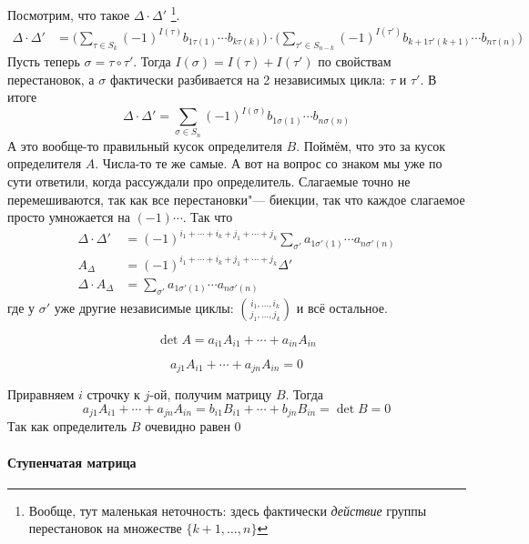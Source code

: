 \documentclass[12pt]{../../../notes}
\begin{document}
\begin{ittproof}
  Посмотрим, что такое  $\Delta\cdot \Delta'$
  \footnote{Вообще, тут маленькая неточность: здесь фактически 
      \emph{действие} группы перестановок на множестве $\{k+1, \dotsc , n\}$}.
  \begin{align*}
    \Delta \cdot \Delta' 
    &= \Bigg( \sum_{\tau \in S_k} (-1)^{I(\tau)} b_{1\tau(1)} \dotsm
    b_{k\tau(k)} \Bigg) \cdot \Bigg( \sum_{\tau' \in S_{n-k}} (-1)^{I(\tau')} b_{k+1\tau'(k+1)} \dotsm
    b_{n\tau(n)} \Bigg)
  \end{align*}
  Пусть теперь $\sigma = \tau \circ \tau'$. Тогда $I(\sigma) = I(\tau)+I(\tau')$ по свойствам
  перестановок, а $\sigma$ фактически разбивается на 2 независимых цикла: $\tau$ и $\tau'$.
  В итоге
  \[
    \Delta \cdot \Delta' 
    = \sum_{\sigma\in S_n} (-1)^{I(\sigma)} b_{1\sigma(1)} \dotsm b_{n\sigma(n)}
  \]
  А это вообще-то правильный кусок определителя $B$. 
  Поймём, что это за кусок определителя $A$.
  Числа-то те же самые. А вот на вопрос со знаком мы уже по сути ответили, когда рассуждали про 
  определитель. Слагаемые точно не перемешиваются, так как все перестановки"--- биекции, 
  так что каждое слагаемое просто умножается на $(-1){\cdots}$. 
  Так что 
  \begin{align*}
    \Delta \cdot \Delta' &= (-1)^{i_1  + \dotsb + i_k  + j_1  + \dotsb + j_k } 
    \sum_{\sigma'} a_{1\sigma'(1)} \dotsm a_{n\sigma'(n)} \\
    A_{\Delta} &= (-1)^{i_1  + \dotsb + i_k  + j_1  + \dotsb + j_k } \Delta'  \\
    \Delta \cdot A_{\Delta} &= \sum_{\sigma'} a_{1\sigma'(1)} \dotsm a_{n\sigma'(n)}
  \end{align*}
  где у $\sigma'$ уже другие независимые циклы: ${i_1, \dotsc , i_k\choose j_1, \dotsc , j_k }$ 
  и всё остальное.

\end{ittproof}
\begin{imp}
  \[
    \det A = a_{i1} A_{i1} + \dotsb + a_{in} A_{in} 
  \]
\end{imp}
\begin{imp}
  \[
    a_{j1} A_{i1} + \dotsb + a_{jn} A_{in} = 0
  \]
\end{imp}
\begin{itlproof}
  Приравняем $i$ строчку к $j$-ой, получим матрицу $B$. Тогда
  \[
    a_{j1} A_{i1} + \dotsb + a_{jn} A_{in} = b_{i1} B_{i1} + \dotsb + b_{jn} B_{in} = \det B = 0
  \]
  Так как определитель $B$ очевидно равен 0
\end{itlproof}

\paragraph{Ступенчатая матрица}
\end{document}
